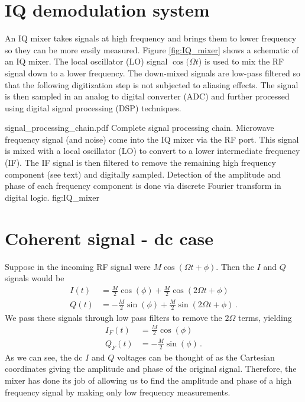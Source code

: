 \section{IQ demodulation system}

An IQ mixer takes signals at high frequency and brings them to lower frequency so they can be more easily measured.
Figure \ref{fig:IQ_mixer} shows a schematic of an IQ mixer.
The local oscillator (LO) signal $\cos(\Omega t$) is used to mix the RF signal down to a lower frequency.
The down-mixed signals are low-pass filtered so that the following digitization step is not subjected to aliasing effects.
The signal is then sampled in an analog to digital converter (ADC) and further processed using digital signal processing (DSP) techniques.

{signal_processing_chain.pdf}
{Complete signal processing chain. Microwave frequency signal (and noise) come into the IQ mixer via the RF port. This signal is mixed with a local oscillator (LO) to convert to a lower intermediate frequency (IF). The IF signal is then filtered to remove the remaining high frequency component (see text) and digitally sampled. Detection of the amplitude and phase of each frequency component is done via discrete Fourier transform in digital logic.}
{fig:IQ_mixer}


\section{Coherent signal - dc case}

Suppose in the incoming RF signal were $M \cos(\Omega t + \phi)$.
Then the $I$ and $Q$ signals would be
\begin{align}
I(t) &= \frac{M}{2} \cos(\phi) + \frac{M}{2} \cos(2\Omega t + \phi) \\
Q(t) &= -\frac{M}{2} \sin(\phi) + \frac{M}{2} \sin(2\Omega t + \phi) \, .
\end{align}
We pass these signals through low pass filters to remove the $2 \Omega$ terms, yielding
\begin{align}
I_F(t) &= \frac{M}{2} \cos(\phi) \\
Q_F(t) &= -\frac{M}{2} \sin(\phi) \, .
\end{align}
As we can see, the dc $I$ and $Q$ voltages can be thought of as the Cartesian coordinates giving the amplitude and phase of the original signal.
Therefore, the mixer has done its job of allowing us to find the amplitude and phase of a high frequency signal by making only low frequency measurements.



